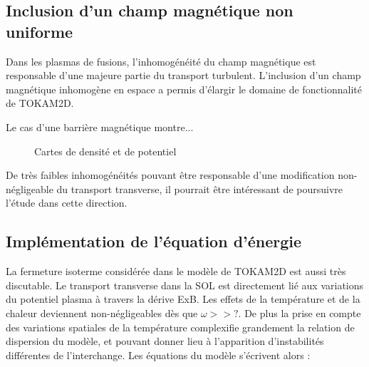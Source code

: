 \begin{refsection}
	\subsection{Inclusion d'un champ magnétique non uniforme}
	Dans les plasmas de fusions, l'inhomogénéité du champ magnétique est responsable d'une majeure partie du transport turbulent.
	L'inclusion d'un champ magnétique inhomogène en espace a permis d'élargir le domaine de fonctionnalité de TOKAM2D. 
	
	Le cas d'une barrière magnétique montre...
	\begin{figure}
    \centering
    \caption{Cartes de densité  et de potentiel
    }
    \label{2-CartesMagBarrier}
\end{figure}

	
	De très faibles inhomogénéités pouvant être responsable d'une modification non-négligeable du transport transverse, il pourrait 
	être intéressant de poursuivre l'étude dans cette direction.
	
	\subsection{Implémentation de l'équation d'énergie}
	La fermeture isoterme considérée dans le modèle de TOKAM2D est aussi très
	discutable. Le transport transverse dans la SOL est directement lié aux
	variations du potentiel plasma à travers la dérive ExB.  Les effets de la température et de la chaleur deviennent
	non-négligeables dès que $\omega>>\text{?}$. De plus la prise en compte des
	variations spatiales de la température complexifie grandement la relation de
	dispersion du modèle, et pouvant donner lieu à l'apparition d'instabilités différentes de l'interchange.
	Les équations du modèle s'écrivent alors :
	

\end{refsection}
